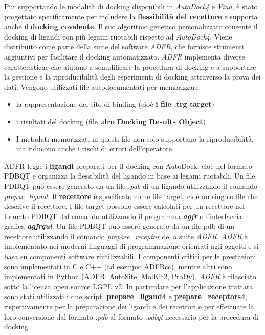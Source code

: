 Pur supportando le modalità di docking disponibili in \textit{AutoDock4} e \textit{Vina}, è stato progettato specificamente per includere la \textbf{flessibilità del recettore} e supporta anche il \textbf{docking covalente}. Il suo algoritmo genetico personalizzato consente il docking di ligandi con più legami ruotabili rispetto ad \textit{AutoDock4}.\newline
Viene distribuito come parte della suite del software \textit{ADFR}, che fornisce strumenti aggiuntivi per facilitare il docking automatizzato.\newline
\textit{ADFR} implementa diverse caratteristiche che aiutano a semplificare la procedura di docking e a supportare la gestione e la riproducibilità degli esperimenti di docking attraverso la prova dei dati. Vengono utilizzati file autodocumentati per memorizzare: 

\begin{itemize}
    \item la rappresentazione del sito di binding (cioè \textbf{i file .trg target})
    \item i risultati del docking (file \textbf{.dro Docking Results Object})
    \item I metadati memorizzati in questi file non solo supportano la riproducibilità, ma riducono anche i rischi di errori dell'operatore.
\end{itemize}

ADFR legge i \textbf{ligandi} preparati per il docking con AutoDock, cioè nel formato PDBQT e organizza la flessibilità del ligando in base ai legami ruotabili. Un file PDBQT può essere generato da un file \textit{.pdb} di un ligando utilizzando il comando \textit{prepar\_ligand}.\newline 
Il \textbf{recettore} è specificato come file target, cioè un singolo file che descrive il recettore. I file target possono essere calcolati per un recettore nel formato PDBQT dal comando utilizzando il programma \textit{\textbf{agfr}} o l'interfaccia grafica \textit{\textbf{agfrgui}}. Un file PDBQT può essere generato da un file pdb di un recettore utilizzando il comando \textit{prepare\_receptor} della suite \textit{ADFR}. \newline
\textit{ADFR} è implementato nei moderni linguaggi di programmazione orientati agli oggetti e si basa su componenti software riutilizzabili. I componenti critici per le prestazioni sono implementati in C e C++ (ad esempio ADFRcc), mentre altri sono implementati in Python (ADFR, AutoSite, MolKit2, ProDy). \textit{ADFR} è rilasciato sotto la licenza open source LGPL v2.\newline 
In particolare per l'applicazione trattata sono stati utilizzati i due script: \textbf{prepare\_ligand4} e \textbf{prepare\_receptors4}, rispettivamente per la preparazione dei ligandi e dei recettori e per effettuare la loro conversione dal formato \textit{.pdb} al formato \textit{.pdbqt} necessario per la procedura di docking.

